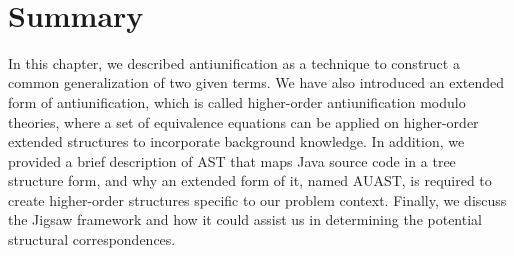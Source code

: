  
\section{Summary}  \label{summary}
In this chapter, we described antiunification as a technique to construct a common generalization of two given terms. We have also introduced an extended form of antiunification, which is called higher-order antiunification modulo theories, where a set of equivalence equations can be applied on higher-order extended structures to incorporate background knowledge. In addition,
we provided a brief description of AST that maps Java source code in a tree structure form, and why an extended form of it, named AUAST, is required to create higher-order structures specific to our problem context. Finally, we discuss the Jigsaw framework and how it could assist us in determining the potential structural correspondences.
